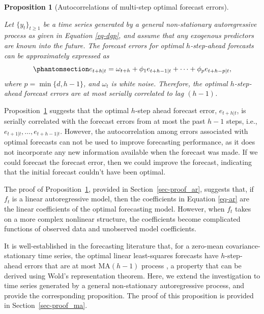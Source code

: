 \documentclass[
  11pt,
  12pt]{article}
\theoremstyle{plain}
\newtheorem{proposition}{Proposition}[section]
\theoremstyle{remark}
\begin{document}
\begin{proposition}[Autocorrelations of multi-step optimal forecast
errors]\protect\hypertarget{prp-ar}{}\label{prp-ar}

Let \(\{y_t\}_{t \geq 1}\) be a time series generated by a general
non-stationary autoregressive process as given in Equation
\eqref{eq-dgp}, and assume that any exogenous predictors are known into
the future. The forecast errors for optimal \(h\)-step-ahead forecasts
can be approximately expressed as
\begin{equation}\phantomsection\label{eq-ar}{
e_{t+h|t} = \omega_{t+h} + \phi_1e_{t+h-1|t} + \cdots + \phi_{p}e_{t+h-p|t},
}\end{equation} where \(p=\min\{d, h-1\}\), and \(\omega_{t}\) is white
noise. Therefore, the optimal \(h\)-step-ahead forecast errors are at
most serially correlated to lag \((h-1)\).

\end{proposition}

Proposition~\ref{prp-ar} suggests that the optimal \(h\)-step ahead
forecast error, \(e_{t+h|t}\), is serially correlated with the forecast
errors from at most the past \(h-1\) steps, i.e.,
\(e_{t+1|t}, \ldots, e_{t+h-1|t}\). However, the autocorrelation among
errors associated with optimal forecasts can not be used to improve
forecasting performance, as it does not incorporate any new information
available when the forecast was made. If we could forecast the forecast
error, then we could improve the forecast, indicating that the initial
forecast couldn't have been optimal.

The proof of Proposition~\ref{prp-ar}, provided in
Section~\ref{sec-proof_ar}, suggests that, if \(f_t\) is a linear
autoregressive model, then the coefficients in Equation \eqref{eq-ar}
are the linear coefficients of the optimal forecasting model. However,
when \(f_t\) takes on a more complex nonlinear structure, the
coefficients become complicated functions of observed data and
unobserved model coefficients.

It is well-established in the forecasting literature that, for a
zero-mean covariance-stationary time series, the optimal linear
least-squares forecasts have \(h\)-step-ahead errors that are at most
MA\((h-1)\) process \citep{harvey1997, diebold2024}, a property that can
be derived using Wold's representation theorem. Here, we extend the
investigation to time series generated by a general non-stationary
autoregressive process, and provide the corresponding proposition. The
proof of this proposition is provided in Section~\ref{sec-proof_ma}.
\end{document}
